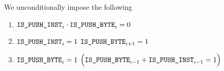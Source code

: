 We unconditionally impose the following
\begin{enumerate}
    \item $\IP_{i} \cdot \IPD_{i} = 0$
    \item \If $\IP_{i} = 1$ \Then $\IPD_{i + 1} = 1$
    \item \If $\IPD_{i} = 1$ \Then $\Big(\IPD_{i - 1} + \IP_{i - 1} = 1\Big)$
\end{enumerate}
